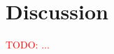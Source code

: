 \documentclass{article}
\newcommand{\todo}[1]{ \textcolor{red}{TODO: #1} }
\begin{document}


\section{Discussion}

\todo{...}






\end{document}
